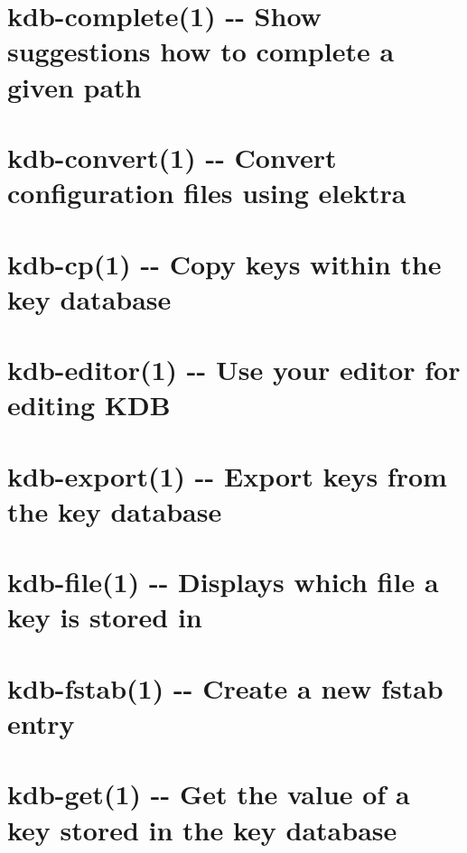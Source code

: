 \documentclass[twoside]{book}
\newcommand{\+}{\discretionary{\mbox{\scriptsize$\hookleftarrow$}}{}{}}
\begin{document}
\chapter{kdb-\/complete(1) -\/-\/ Show suggestions how to complete a given path}
\label{md_doc_help_kdb-complete}

\chapter{kdb-\/convert(1) -\/-\/ Convert configuration files using elektra}
\label{md_doc_help_kdb-convert}

\chapter{kdb-\/cp(1) -\/-\/ Copy keys within the key database}
\label{md_doc_help_kdb-cp}

\chapter{kdb-\/editor(1) -\/-\/ Use your editor for editing K\+DB}
\label{md_doc_help_kdb-editor}

\chapter{kdb-\/export(1) -\/-\/ Export keys from the key database}
\label{md_doc_help_kdb-export}

\chapter{kdb-\/file(1) -\/-\/ Displays which file a key is stored in}
\label{md_doc_help_kdb-file}

\chapter{kdb-\/fstab(1) -\/-\/ Create a new fstab entry}
\label{md_doc_help_kdb-fstab}

\chapter{kdb-\/get(1) -\/-\/ Get the value of a key stored in the key database}
\label{md_doc_help_kdb-get}

\end{document}
